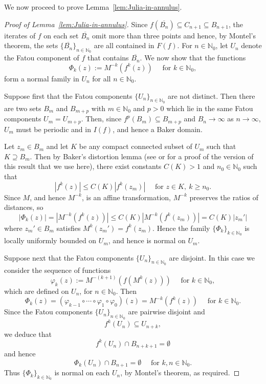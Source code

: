 \documentclass[a4paper, 12pt, reqno]{amsart}
\numberwithin{equation}{section}
\theoremstyle{plain}
\theoremstyle{definition}
\theoremstyle{remark}
\newcommand{\N}{{\mathbb{N}}}
\begin{document}
We now proceed to prove Lemma~\ref{lem:Julia-in-annulus}.

\begin{proof}[Proof of Lemma~\ref{lem:Julia-in-annulus}]
Since $f(\overline{B_n})\subseteq C_{n+1}\subseteq B_{n+1}$, the iterates of $f$ on each set $\overline{B_n}$ omit more than three points and hence, by Montel's theorem, the sets $\{\overline{B_n}\}_{n\in\N_0}$ are all contained in $F(f)$. For $n\in \N_0$, let $U_n$ denote the Fatou component of $f$ that contains $\overline{B_n}$. We now show that the functions
$$
\Phi_{k}(z):=M^{-k}(f^k(z))\quad \mbox{ for } k\in\N_0,
$$
form a normal family in $U_n$ for all $n\in\N_0$.

Suppose first that the Fatou components $\{U_n\}_{n\in\N_0}$ are not distinct. Then there are two sets $B_m$ and $B_{m+p}$ with $m\in\N_0$ and $p>0$ which lie in the same Fatou components $U_m=U_{m+p}$. Then, since $f^p(B_m)\subseteq B_{m+p}$ and $B_n\to \infty$ as $n\to \infty$, $U_m$ must be periodic and in $I(f)$, and hence a Baker domain.

Let $z_m\in B_m$ and let $K$ be any compact connected subset of $U_m$ such that $K\supseteq B_m$. Then by Baker's distortion lemma (see \cite[Lemma~6.2]{martipete1} or \cite[Lemma~2.22]{martipete} for a proof of the version of this result that we use here), there exist constants \mbox{$C(K)>1$} and $n_0\in\N_0$ such that 
$$
|f^k(z)|\leqslant C(K) |f^k(z_m)|\quad \mbox{ for } z\in K,\ k\geqslant n_0.
$$
Since $M$, and hence $M^{-k}$, is an affine transformation, $M^{-k}$ preserves the ratios of distances, so
$$
|\Phi_k(z)|=|M^{-k}(f^k(z))|\leqslant C(K)|M^{-k}(f^k(z_m))|=C(K)|z_m'|
$$
where $z_m'\in B_m$ satisfies $M^k(z_m')=f^k(z_m)$. Hence the family $\{\Phi_k\}_{k\in \N_0}$ is locally uniformly bounded on $U_m$, and hence is normal on $U_m$.

Suppose next that the Fatou components $\{U_n\}_{n\in\N_0}$ are disjoint. In this case we consider the sequence of functions 
$$
\varphi_k(z):=M^{-(k+1)}(f(M^k(z)))\quad \mbox{ for } k\in\N_0,
$$
which are defined on $U_n$, for $n\in\N_0$. Then
\begin{equation}
\Phi_k(z) = (\varphi_{k-1} \circ \cdots \circ  \varphi_1 \circ \varphi_0)(z) = M^{-k}(f^k(z))\quad \mbox{ for } k\in\N_0.
\label{eq:annuli-lem-1}
\end{equation}
Since the Fatou components $\{U_n\}_{n\in\N_0}$ are pairwise disjoint and
$$
f^k(U_n)\subseteq U_{n+k},
$$
we deduce that
$$
f^k(U_n)\cap B_{n+k+1}=\emptyset
$$
and hence
$$
\Phi_k(U_n)\cap B_{n+1}=\emptyset\quad \mbox{ for } k,n\in\N_0.
$$
Thus $\{\Phi_k\}_{k\in\N_0}$ is normal on each $U_n$, by Montel's theorem, as required.


\end{proof}
\end{document}
